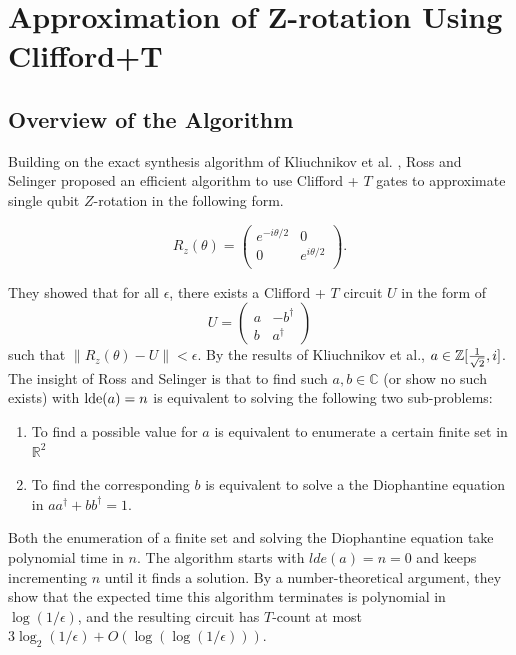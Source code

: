 \section{Approximation of Z-rotation Using Clifford+T}

\subsection{Overview of the Algorithm}

Building on the exact synthesis algorithm of Kliuchnikov et al. \cite{exact-clifford+t}, Ross and Selinger \cite{ross} proposed an efficient algorithm to use Clifford + $T$ gates to approximate single qubit $Z$-rotation in the following form. 

$$
	R_z(\theta) = \begin{pmatrix}
		e^{-i\theta/2} & 0 \\
		0 & e^{i\theta/2} \\
	\end{pmatrix}.
$$

They showed that for all $\epsilon$, there exists a Clifford + $T$ circuit $U$ in the form of 
\begin{equation}\label{ross-form}
U = \begin{pmatrix}
	a & -b^\dagger \\ 
	b & a^\dagger
\end{pmatrix}
\end{equation}
such that $\|R_z (\theta) - U \| < \epsilon$.
By the results of Kliuchnikov et al., $a \in \mathbb{Z}[\frac{1}{\sqrt{2}}, i]$. 
The insight of Ross and Selinger is that to find such $a, b \in \mathbb{C}$ (or show no such exists) with $\text{lde}(a) = n$ is equivalent to solving the following two sub-problems:
\begin{enumerate}
	\item To find a possible value for $a$ is equivalent to enumerate a certain finite set in $\mathbb{R}^2$
	\item To find the corresponding $b$ is equivalent to solve a the Diophantine equation in $aa^\dagger + bb^\dagger = 1$.
\end{enumerate}
Both the enumeration of a finite set and solving the Diophantine equation take polynomial time in $n$.
The algorithm starts with $lde(a) = n = 0$ and keeps incrementing $n$ until it finds a solution.
By a number-theoretical argument, they show that the expected time this algorithm terminates is polynomial in $\log(1/\epsilon)$, and the resulting circuit has $T$-count at most $3 \log_2(1/\epsilon) + O(\log(\log(1/\epsilon)))$.

